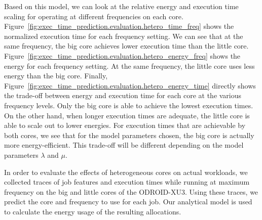 Based on this model, we can look at the relative energy and execution time
scaling for operating at different frequencies on each core.
Figure~\ref{fig:exec_time_prediction.evaluation.hetero_time_freq} shows the
normalized execution time for each frequency setting. We can see that at the
same frequency, the big core achieves lower execution time than the little
core. Figure~\ref{fig:exec_time_prediction.evaluation.hetero_energy_freq} shows
the energy for each frequency setting. At the same frequency, the little core
uses less energy than the big core. Finally,
Figure~\ref{fig:exec_time_prediction.evaluation.hetero_energy_time} directly
shows the trade-off between energy and execution time for each core at the
various frequency levels. Only the big core is able to achieve the lowest execution
times. On the other hand, when longer execution times are adequate, the little
core is able to scale out to lower energies. For execution times that are
achievable by both cores, we see that for the model parameters chosen,
the big core is actually more energy-efficient. This trade-off will be
different depending on the model parameters $\lambda$ and $\mu$.

In order to evaluate the effects of heterogeneous cores on actual workloads, we
collected traces of job features and execution times while running at maximum
frequency on the big and little cores of the ODROID-XU3. Using these traces, we
predict the core and frequency to use for each job. Our analytical model is
used to calculate the energy usage of the resulting allocations.

